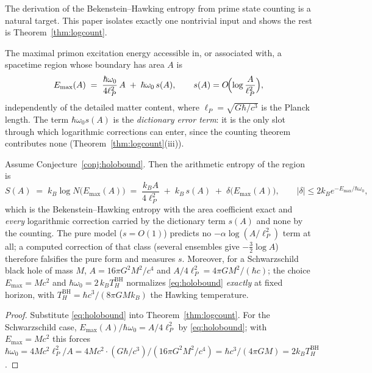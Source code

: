 The derivation of the Bekenstein--Hawking entropy from prime state counting
is a natural target. This paper isolates exactly one
nontrivial input and shows the rest is Theorem~\ref{thm:logcount}.

\begin{conjecture}\label{conj:holobound}
The maximal primon excitation energy accessible in, or associated with, a spacetime region
whose boundary has area $A$ is
\begin{equation}\label{eq:holobound}
E_{\max}(A)\;=\;\frac{\hbar\omega_{0}}{4\ell_{P}^{2}}\,A\;+\;\hbar\omega_{0}\,s(A),
\qquad
s(A)=O\!\Bigl(\log\frac{A}{\ell_{P}^{2}}\Bigr),
\end{equation}
independently of the detailed matter content, where
$\ell_{P}=\sqrt{G\hbar/c^{3}}$ is the Planck length. The term $\hbar\omega_{0}s(A)$ is the
\emph{dictionary error term}: it is the only slot through which logarithmic corrections can
enter, since the counting theorem contributes none (Theorem~\ref{thm:logcount}(iii)).
\end{conjecture}

\begin{theorem}\label{thm:bh}
Assume Conjecture~\ref{conj:holobound}. Then the arithmetic entropy of the region is
\begin{equation}
S(A)\;=\;k_{B}\log N\bigl(E_{\max}(A)\bigr)
\;=\;\frac{k_{B}A}{4\ell_{P}^{2}}\;+\;k_{B}\,s(A)\;+\;\delta\bigl(E_{\max}(A)\bigr),
\qquad
|\delta|\leq2k_{B}e^{-E_{\max}/\hbar\omega_{0}},
\end{equation}
which is the Bekenstein--Hawking entropy \cite{bekenstein1973,hawking1975} with the area
coefficient exact and \emph{every} logarithmic correction carried by the dictionary term
$s(A)$ and none by the counting. The pure model ($s=O(1)$) predicts no
$-\alpha\log(A/\ell_{P}^{2})$ term at all; a computed correction of that class (several
ensembles give $-\tfrac32\log A$) therefore falsifies the pure form and measures $s$.
Moreover, for a Schwarzschild black hole of
mass $M$, $A=16\pi G^{2}M^{2}/c^{4}$ and $A/4\ell_{P}^{2}=4\pi GM^{2}/(\hbar c)$; the choice
$E_{\max}=Mc^{2}$ and $\hbar\omega_{0}=2\,k_{B}T_{H}^{\mathrm{BH}}$ normalizes
\eqref{eq:holobound} \emph{exactly} at fixed horizon, with $T_{H}^{\mathrm{BH}}=\hbar c^{3}/(8\pi GMk_{B})$
the Hawking temperature.
\end{theorem}

\begin{proof}
Substitute \eqref{eq:holobound} into Theorem~\ref{thm:logcount}. For the Schwarzschild case,
$E_{\max}(A)/\hbar\omega_{0}=A/4\ell_{P}^{2}$ by \eqref{eq:holobound}; with
$E_{\max}=Mc^{2}$ this forces $\hbar\omega_{0}=4Mc^{2}\ell_{P}^{2}/A
=4Mc^{2}\cdot(G\hbar/c^{3})/(16\pi G^{2}M^{2}/c^{4})
=\hbar c^{3}/(4\pi GM)=2k_{B}T_{H}^{\mathrm{BH}}$.
\end{proof}

